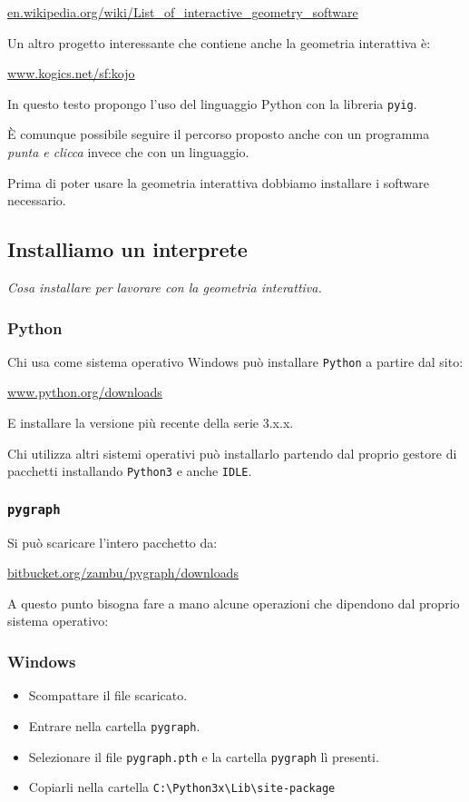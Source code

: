 \url{en.wikipedia.org/wiki/List_of_interactive_geometry_software}

Un altro progetto interessante che contiene anche la geometria interattiva è:

\url{www.kogics.net/sf:kojo}

In questo testo propongo l'uso del linguaggio 
Python con la libreria \texttt{pyig}.

È comunque possibile seguire il percorso proposto anche con un programma
\emph{punta e clicca} invece che con un linguaggio.

Prima di poter usare la geometria interattiva dobbiamo installare i  software 
necessario.

\subsection{Installiamo un interprete}
\label{sec:05_02installazione}

\emph{Cosa installare per lavorare con la geometria interattiva.}

\subsubsection{Python}

Chi usa come sistema operativo Windows può installare \texttt{Python} 
a partire dal sito:

\url{www.python.org/downloads}

E installare la versione più recente della serie 3.x.x.

Chi utilizza altri sistemi operativi può installarlo partendo dal proprio
gestore di pacchetti installando \texttt{Python3} e anche \texttt{IDLE}.

\subsubsection{\texttt{pygraph}}

Si può scaricare l'intero pacchetto da:

\url{bitbucket.org/zambu/pygraph/downloads}

A questo punto bisogna fare a mano alcune operazioni che dipendono dal 
proprio sistema operativo:

\subsubsection*{Windows}

\begin{itemize} [noitemsep]
\item {} Scompattare il file scaricato.
\item {} Entrare nella cartella \texttt{pygraph}.
\item {} Selezionare il file \texttt{pygraph.pth} e la cartella 
  \texttt{pygraph} lì presenti.
\item {} Copiarli nella cartella 
\texttt{C:\textbackslash Python3x\textbackslash Lib\textbackslash site-package}
\end{itemize}

